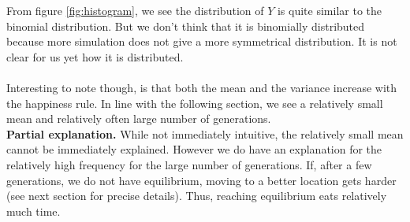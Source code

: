 From figure \ref{fig:histogram}, we see the distribution of $Y$ is quite similar to the binomial distribution. But we don't think that it is binomially distributed because more simulation does not give a more symmetrical distribution. It is not clear for us yet how it is distributed.\\
\\
Interesting to note though, is that both the mean and the variance increase with the happiness rule. In line with the following section, we see a relatively small mean and relatively often large number of generations.\\
\textbf{Partial explanation.} While not immediately intuitive, the relatively small mean cannot be immediately explained. However we do have an explanation for the relatively high frequency for the large number of generations. If, after a few generations, we do not have equilibrium, moving to a better location gets harder (see next section for precise details). Thus, reaching equilibrium eats relatively much time.